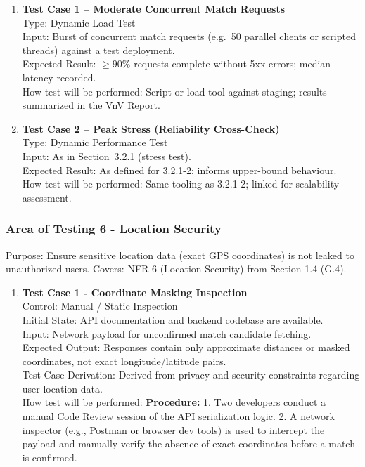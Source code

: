 \documentclass[12pt, titlepage]{article}
\begin{document}
\begin{enumerate}
\item \textbf{Test Case 1 – Moderate Concurrent Match Requests}\\
Type: Dynamic Load Test\\
Input: Burst of concurrent match requests (e.g.\ 50 parallel clients or scripted threads) against a test deployment.\\
Expected Result: $\geq 90\%$ requests complete without 5xx errors; median latency recorded.\\
How test will be performed: Script or load tool against staging; results summarized in the VnV Report.\\[5pt]

\item \textbf{Test Case 2 – Peak Stress (Reliability Cross-Check)}\\
Type: Dynamic Performance Test\\
Input: As in Section~3.2.1 (stress test).\\
Expected Result: As defined for 3.2.1-2; informs upper-bound behaviour.\\
How test will be performed: Same tooling as 3.2.1-2; linked for scalability assessment.\\
\end{enumerate}

\subsubsection{Area of Testing 6 - Location Security}

Purpose: Ensure sensitive location data (exact GPS coordinates) is not leaked to unauthorized users.  
Covers: NFR-6 (Location Security) from Section 1.4 (G.4).

\begin{enumerate}
\item \textbf{Test Case 1 - Coordinate Masking Inspection}\\
Control: Manual / Static Inspection\\
Initial State: API documentation and backend codebase are available.\\
Input: Network payload for unconfirmed match candidate fetching.\\
Expected Output: Responses contain only approximate distances or masked coordinates, not exact longitude/latitude pairs.\\
Test Case Derivation: Derived from privacy and security constraints regarding user location data.\\
How test will be performed: \textbf{Procedure:} 1. Two developers conduct a manual Code Review session of the API serialization logic. 2. A network inspector (e.g., Postman or browser dev tools) is used to intercept the payload and manually verify the absence of exact coordinates before a match is confirmed.\\
\end{enumerate}
\end{document}
